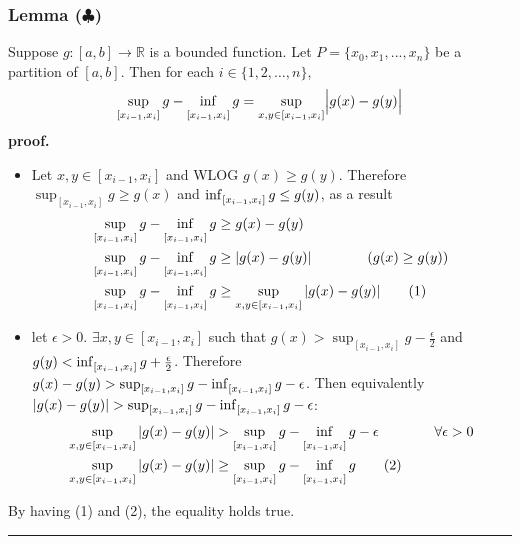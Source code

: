 \documentclass[12pt, letterpaper]{article}
\newcommand{\R}{\mathbb{R}}
\renewcommand{\inf}{\mathop{\mathrm{inf}\vphantom{\mathrm{sup}}}}
\begin{document}
\subsubsection*{Lemma ($\clubsuit$)}
{\color{violet}Suppose $g: [a,b]\rightarrow \R$ is a bounded function. Let $P=\{x_0, x_1, . . . , x_n\}$ be a partition of
$[a, b]$. Then for each $i\in \{1, 2,\dots, n\}$,
\begin{align*}
    \sup_{[x_{i-1}, x_i]}g-\inf_{[x_{i-1}, x_i]}g=\sup_{x,y\in[x_{i-1}, x_i]}\Bigl|g(x)-g(y)\Bigr|
\end{align*}
}\textbf{proof.}
\begin{itemize}
    \item Let $x,y\in[x_{i-1}, x_i]$ and WLOG $g(x)\geq g(y)$. Therefore $\sup_{[x_{i-1}, x_i]}g\geq g(x)$ and $\inf_{[x_{i-1}, x_i]}g\leq g(y)$, as a result
    \begin{align*}
        \sup_{[x_{i-1}, x_i]}g-\inf_{[x_{i-1}, x_i]}g
        &\geq
        g(x)-g(y)\\
        \sup_{[x_{i-1}, x_i]}g-\inf_{[x_{i-1}, x_i]}g
        &\geq
        |g(x)-g(y)|\qquad\qquad(g(x)\geq g(y))\\
        \sup_{[x_{i-1}, x_i]}g-\inf_{[x_{i-1}, x_i]}g
        &\geq
        \sup_{x,y\in[x_{i-1}, x_i]}|g(x)-g(y)| \tag{1}
    \end{align*}
    \item let $\epsilon>0$. $\exists x,y\in[x_{i-1}, x_i]$ such that $g(x)>\sup_{[x_{i-1}, x_i]}g-\frac{\epsilon}{2}$ and $g(y)<\inf_{[x_{i-1}, x_i]}g+\frac{\epsilon}{2}$. Therefore $g(x)-g(y)>\sup_{[x_{i-1}, x_i]}g-\inf_{[x_{i-1}, x_i]}g-\epsilon$. Then equivalently $|g(x)-g(y)|>\sup_{[x_{i-1}, x_i]}g-\inf_{[x_{i-1}, x_i]}g-\epsilon$:
    \begin{align*}
        \sup_{x,y\in[x_{i-1}, x_i]}|g(x)-g(y)|
        &>
        \sup_{[x_{i-1}, x_i]}g-\inf_{[x_{i-1}, x_i]}g-\epsilon \qquad\qquad \forall\epsilon>0\\
        \sup_{x,y\in[x_{i-1}, x_i]}|g(x)-g(y)|
        &\geq
        \sup_{[x_{i-1}, x_i]}g-\inf_{[x_{i-1}, x_i]}g\tag{2}
    \end{align*}
\end{itemize}
By having (1) and (2), the equality holds true.\\
\hrule
\end{document}
